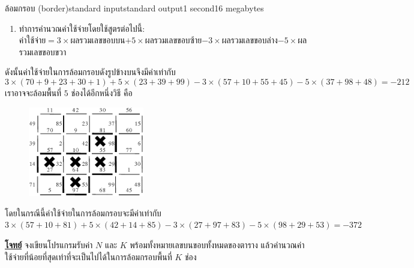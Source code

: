 \documentclass[11pt,a4paper]{article}
\begin{document}
\begin{problem}{ล้อมกรอบ (border)}{standard input}{standard output}{1 second}{16 megabytes}
\begin{enumerate}
\begin{itemize}
\item ขอบล่าง คือ ขอบแนวนอนที่อยู่ล่างสุดของตาราง หรือช่องที่อยู่เหนือมันเป็นช่องที่ถูกล้อมกรอบ และช่องที่อยู่ใต้มันเป็นช่องที่ไม่ถูกล้อมกรอบ ในตัวอย่างคือขอบที่มีหมายเลข 57, 10, 55, และ 45

\item ขอบซ้าย คือ ขอบแนวตั้ง ที่อยู่ซ้ายสุดของตาราง หรือช่องที่อยู่ด้านขวาของมันเป็นช่องที่ถูกล้อมกรอบ และช่องที่อยู่ด้านซ้ายของมันเป็นช่องที่ไม่ถูกล้อมกรอบ ในตัวอย่างคือขอบที่มีหมายเลข 23, 39, และ 99

\item ขอบขวา คือ ขอบแนวตั้ง ที่อยู่ขวาสุดของตาราง หรือช่องที่ทางด้านซ้ายของมันเป็นช่องที่ถูกล้อมกรอบ และช่องที่อยู่ด้านขวาของมันเป็นช่องที่ไม่ถูกล้อมกรอบ ในตัวอย่างคือ ขอบที่มีหมายเลข 37, 98, และ 48
\end{itemize}  
\item ทำการคำนวณค่าใช้จ่ายโดยใช้สูตรต่อไปนี้:\\ค่าใช้จ่าย$= 3\times$ผลรวมเลขขอบบน$+ 5 \times$ผลรวมเลขขอบซ้าย$- 3 \times$ผลรวมเลขขอบล่าง$- 5 \times$ผลรวมเลขขอบขวา
 \end{enumerate}
 
    ดังนั้นค่าใช้จ่ายในการล้อมกรอบดังรูปข้างบนจึงมีค่าเท่ากับ
 $$3 \times (70+9+23+30+1) + 5 \times (23+39+99) - 3\times (57+10+55+45) - 5\times (37+98+48) = -212$$
     เราอาจจะล้อมพื้นที่ $5$ ช่องได้อีกหนึ่งวิธี คือ

\begin{figure}[h!]
\centering
\includegraphics[width=0.45\textwidth]{../latex/img/1068/1068-3.png}
\end{figure}


    โดยในกรณีนี้ค่าใช้จ่ายในการล้อมกรอบจะมีค่าเท่ากับ
$3\times (57+10+81) + 5\times (42+14+85) - 3\times (27+97+83) - 5\times(98+29+53) = -372$

\bigskip
\underline{\textbf{โจทย์}}  จงเขียนโปรแกรมรับค่า $N$ และ $K$ พร้อมทั้งหมายเลขบนขอบทั้งหมดของตาราง แล้วคำนวณค่าใช้จ่ายที่น้อยที่สุดเท่าที่จะเป็นไปได้ในการล้อมกรอบพื้นที่ $K$ ช่อง

\InputFile


\end{problem}
\end{document}
